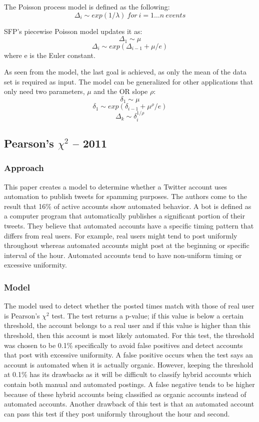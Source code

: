 \documentclass[11pt, oneside]{article}   	%
\begin{document}
The Poisson process model is defined as the following:
$$ \Delta_i \sim exp(1/ \lambda) \ for \ i = 1 \dots n \ events $$

SFP's piecewise Poisson model updates it as:
$$ \Delta_1 \sim \mu $$
$$ \Delta_i \sim exp(\Delta_{i-1} + \mu / e) $$
where e is the Euler constant.

As seen from the model, the last goal is achieved, as only the mean of the data set is required as input.
The model can be generalized for other applications that only need two parameters, $\mu$ and the OR slope $\rho$:
$$ \delta_1 \sim \mu $$
$$ \delta_1 \sim exp(\delta_{i-1} + \mu^{\rho} / e) $$
$$ \Delta_k \sim \delta_i^{1/ \rho} $$

\subsection*{Pearson's $\chi^2$ -- 2011}

\subsubsection*{Approach}

\quad This paper creates a model to determine whether a Twitter account uses automation to publish tweets for spamming purposes. 
The authors come to the result that 16\% of active accounts show automated behavior.
A bot is defined as a computer program that automatically publishes a significant portion of their tweets.
They believe that automated accounts have a specific timing pattern that differs from real users.
For example, real users might tend to post uniformly throughout whereas automated accounts might post at the beginning or specific interval of the hour.
Automated accounts tend to have non-uniform timing or excessive uniformity.

\subsubsection*{Model}

\quad The model used to detect whether the posted times match with those of real user is Pearson's $\chi^2$ test.
The test returns a p-value; if this value is below a certain threshold, the account belongs to a real user and if this value is higher than this threshold, then this account is most likely automated.
For this test, the threshold was chosen to be 0.1\% specifically to avoid false positives and detect accounts that post with excessive uniformity.
A false positive occurs when the test says an account is automated when it is actually organic.
However, keeping the threshold at 0.1\% has its drawbacks as it will be difficult to classify hybrid accounts which contain both manual and automated postings.
A false negative tends to be higher because of these hybrid accounts being classified as organic accounts instead of automated accounts.
Another drawback of this test is that an automated account can pass this test if they post uniformly throughout the hour and second.
 
\end{document}
